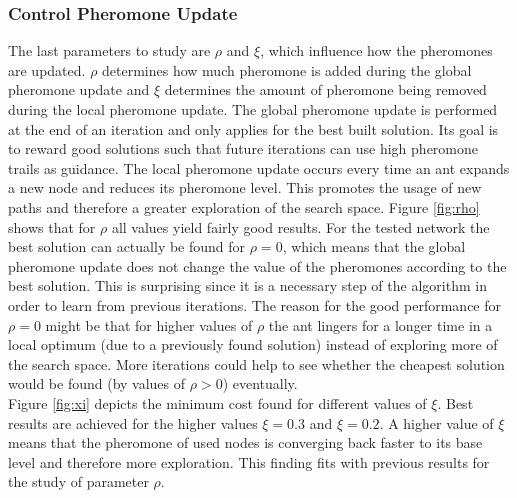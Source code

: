 \subsubsection{Control Pheromone Update}\label{pheromone_update}

The last parameters to study are $\rho$ and $\xi$, which influence how the pheromones are updated. $\rho$ determines how much pheromone is added during the global pheromone update and $\xi$ determines the amount of pheromone being removed during the local pheromone update. The global pheromone update is performed at the end of an iteration and only applies for the best built solution. Its goal is to reward good solutions such that future iterations can use high pheromone trails as guidance. The local pheromone update occurs every time an ant expands a new node and reduces its pheromone level. This promotes the usage of new paths and therefore a greater exploration of the search space. Figure \ref{fig:rho} shows that for $\rho$ all values yield fairly good results. For the tested network the best solution can actually be found for $\rho = 0$, which means that the global pheromone update does not change the value of the pheromones according to the best solution. This is surprising since it is a necessary step of the algorithm in order to learn from previous iterations. The reason for the good performance for $\rho = 0$ might be that for higher values of $\rho$ the ant lingers for a longer time in a local optimum (due to a previously found solution) instead of exploring more of the search space. More iterations could help to see whether the cheapest solution would be found (by values of $\rho > 0$) eventually. \\

Figure \ref{fig:xi} depicts the minimum cost found for different values of $\xi$. Best results are achieved for the higher values $\xi = 0.3$ and $\xi = 0.2$. A higher value of $\xi$ means that the pheromone of used nodes is converging back faster to its base level and therefore more exploration. This finding fits with previous results for the study of parameter $\rho$.

